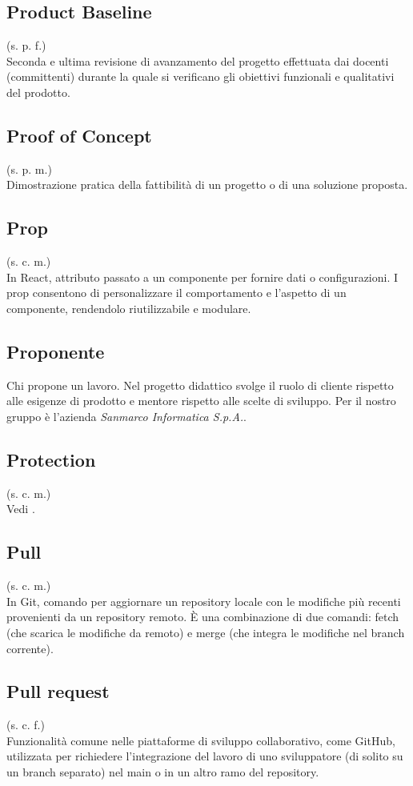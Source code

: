 \subsection{Product Baseline}
\label{Product Baseline}
(s. p. f.)\\
Seconda e ultima revisione di avanzamento del progetto effettuata dai docenti (committenti)
durante la quale si verificano gli obiettivi funzionali e qualitativi del prodotto.
\subsection{Proof of Concept}
\label{Proof of Concept}
(s. p. m.)\\
Dimostrazione pratica della fattibilità di un progetto o di una soluzione proposta.
\subsection{Prop}
(s. c. m.)\\
In React, attributo passato a un componente per fornire dati o configurazioni.
I prop consentono di personalizzare il comportamento e l'aspetto
di un componente, rendendolo riutilizzabile e modulare.
\subsection{Proponente}
\label{Proponente}
Chi propone un lavoro. Nel progetto didattico svolge il ruolo di cliente
rispetto alle esigenze di prodotto e mentore rispetto alle scelte di sviluppo.
Per il nostro gruppo è l'azienda \textit{Sanmarco Informatica S.p.A.}.
\subsection{Protection}
(s. c. m.)\\
Vedi .
\subsection{Pull}
(s. c. m.)\\
In Git, comando per aggiornare un repository locale con le modifiche più recenti provenienti
da un repository remoto. È una combinazione di due comandi: fetch (che scarica le modifiche
da remoto) e merge (che integra le modifiche nel branch corrente).
\subsection{Pull request}
(s. c. f.)\\
Funzionalità comune nelle piattaforme di sviluppo collaborativo, come GitHub, utilizzata per
richiedere l'integrazione del lavoro di uno sviluppatore (di solito su un branch separato)
nel main o in un altro ramo del repository.

